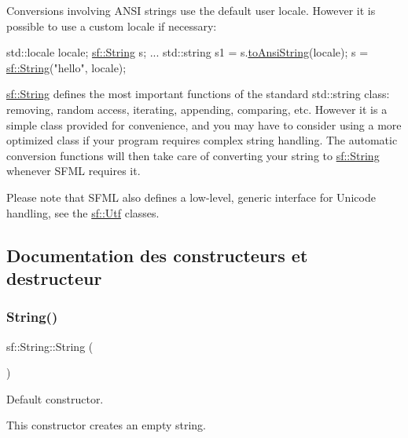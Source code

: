 Conversions involving A\+N\+SI strings use the default user locale. However it is possible to use a custom locale if necessary\+: 
\begin{DoxyCode}
std::locale locale;
\hyperlink{classsf_1_1String}{sf::String} s;
...
std::string s1 = s.\hyperlink{classsf_1_1String_ada5d5bba4528aceb0a1e298553e6c30a}{toAnsiString}(locale);
s = \hyperlink{classsf_1_1String}{sf::String}(\textcolor{stringliteral}{"hello"}, locale);
\end{DoxyCode}


\hyperlink{classsf_1_1String}{sf\+::\+String} defines the most important functions of the standard std\+::string class\+: removing, random access, iterating, appending, comparing, etc. However it is a simple class provided for convenience, and you may have to consider using a more optimized class if your program requires complex string handling. The automatic conversion functions will then take care of converting your string to \hyperlink{classsf_1_1String}{sf\+::\+String} whenever S\+F\+ML requires it.

Please note that S\+F\+ML also defines a low-\/level, generic interface for Unicode handling, see the \hyperlink{classsf_1_1Utf}{sf\+::\+Utf} classes. 

\subsection{Documentation des constructeurs et destructeur}
\mbox{\label{classsf_1_1String_a9563a4e93f692e0c8e8702b374ef8692}} 
\subsubsection{\texorpdfstring{String()}{String()}\hspace{0.1cm}{\footnotesize\ttfamily [1/11]}}
{\footnotesize\ttfamily sf\+::\+String\+::\+String (\begin{DoxyParamCaption}{ }\end{DoxyParamCaption})}



Default constructor. 

This constructor creates an empty string. \mbox{\label{classsf_1_1String_ac9df7f7696cff164794e338f3c89ccc5}} 
